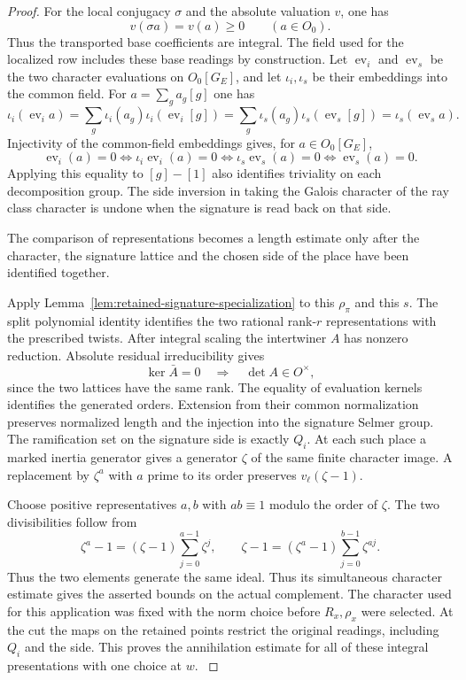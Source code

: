 \begin{proof}
For the local conjugacy \(\sigma\) and the absolute valuation \(v\), one has
\[
 v(\sigma a)=v(a)\ge0\qquad(a\in O_0).
\]
Thus the transported base coefficients are integral. The field used
for the localized row includes these base readings by
construction. Let \(\operatorname{ev}_i\) and \(\operatorname{ev}_s\) be the
two character evaluations on \(O_0[G_E]\), and let \(\iota_i,\iota_s\)
be their embeddings into the common field. For
\(a=\sum_g a_g[g]\) one has
\[
 \iota_i(\operatorname{ev}_i a)
     =\sum_g\iota_i(a_g)\iota_i(\operatorname{ev}_i[g])
     =\sum_g\iota_s(a_g)\iota_s(\operatorname{ev}_s[g])
     =\iota_s(\operatorname{ev}_s a).
\]
Injectivity of the common-field embeddings gives, for \(a\in O_0[G_E]\),
\[
 \operatorname{ev}_i(a)=0\iff\iota_i\operatorname{ev}_i(a)=0\iff\iota_s\operatorname{ev}_s(a)=0\iff\operatorname{ev}_s(a)=0.
\]
Applying this equality to \([g]-[1]\) also identifies
triviality on each decomposition group. The side inversion in taking the Galois
character of the ray class character is undone when the
signature is read back on that side.
\label{cor:marked-localization-3}

The comparison of representations becomes a length estimate only after the character, the signature lattice and the chosen side of the place have been identified together.

Apply Lemma~\ref{lem:retained-signature-specialization}
to this \(\rho_\pi\) and this \(s\). The split polynomial identity
identifies the two rational rank-\(r\) representations with the
prescribed twists. After integral scaling the intertwiner \(A\) has nonzero reduction. Absolute residual irreducibility gives
\[
 \ker\bar A=0\quad\Longrightarrow\quad\det A\in O^\times,
\]
since the two lattices have the same rank. The equality of evaluation kernels
identifies the generated orders. Extension from their common
normalization preserves normalized length and the injection
into the signature Selmer group. The ramification set on the
signature side is exactly \(Q_i\). At each such place a marked inertia generator gives a generator
\(\zeta\) of the same finite character image. A replacement by
\(\zeta^a\) with \(a\) prime to its order preserves
\(v_\ell(\zeta-1)\).

Choose positive representatives \(a,b\) with \(ab\equiv1\) modulo
the order of \(\zeta\). The two divisibilities follow from
\[
 \zeta^a-1=(\zeta-1)\sum_{j=0}^{a-1}\zeta^j,\qquad
 \zeta-1=(\zeta^a-1)\sum_{j=0}^{b-1}\zeta^{aj}.
\]
Thus the two elements generate the same ideal. Thus its simultaneous character estimate gives the asserted
bounds on the actual complement.
The character used for this application was fixed with the
norm choice before \(R_x,\rho_x\) were selected. At the cut
the maps on the retained points restrict the original
readings, including \(Q_i\) and the side. This proves the
annihilation estimate for all of these integral presentations
with one choice at \(w\). \label{cor:marked-localization-4}
\end{proof}

